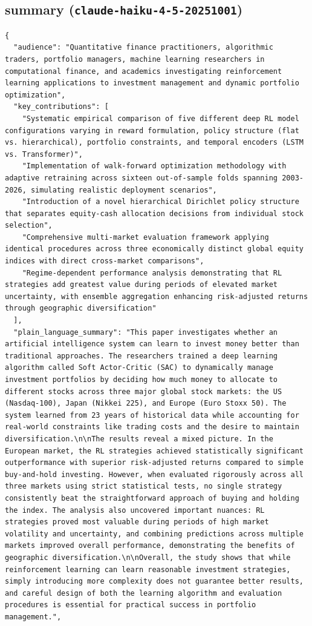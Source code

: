 \documentclass[11pt]{article}
\begin{document}
\subsection*{summary (\texttt{claude-haiku-4-5-20251001})}
\begin{verbatim}
{
  "audience": "Quantitative finance practitioners, algorithmic traders, portfolio managers, machine learning researchers in computational finance, and academics investigating reinforcement learning applications to investment management and dynamic portfolio optimization",
  "key_contributions": [
    "Systematic empirical comparison of five different deep RL model configurations varying in reward formulation, policy structure (flat vs. hierarchical), portfolio constraints, and temporal encoders (LSTM vs. Transformer)",
    "Implementation of walk-forward optimization methodology with adaptive retraining across sixteen out-of-sample folds spanning 2003-2026, simulating realistic deployment scenarios",
    "Introduction of a novel hierarchical Dirichlet policy structure that separates equity-cash allocation decisions from individual stock selection",
    "Comprehensive multi-market evaluation framework applying identical procedures across three economically distinct global equity indices with direct cross-market comparisons",
    "Regime-dependent performance analysis demonstrating that RL strategies add greatest value during periods of elevated market uncertainty, with ensemble aggregation enhancing risk-adjusted returns through geographic diversification"
  ],
  "plain_language_summary": "This paper investigates whether an artificial intelligence system can learn to invest money better than traditional approaches. The researchers trained a deep learning algorithm called Soft Actor-Critic (SAC) to dynamically manage investment portfolios by deciding how much money to allocate to different stocks across three major global stock markets: the US (Nasdaq-100), Japan (Nikkei 225), and Europe (Euro Stoxx 50). The system learned from 23 years of historical data while accounting for real-world constraints like trading costs and the desire to maintain diversification.\n\nThe results reveal a mixed picture. In the European market, the RL strategies achieved statistically significant outperformance with superior risk-adjusted returns compared to simple buy-and-hold investing. However, when evaluated rigorously across all three markets using strict statistical tests, no single strategy consistently beat the straightforward approach of buying and holding the index. The analysis also uncovered important nuances: RL strategies proved most valuable during periods of high market volatility and uncertainty, and combining predictions across multiple markets improved overall performance, demonstrating the benefits of geographic diversification.\n\nOverall, the study shows that while reinforcement learning can learn reasonable investment strategies, simply introducing more complexity does not guarantee better results, and careful design of both the learning algorithm and evaluation procedures is essential for practical success in portfolio management.",

\end{verbatim}
\end{document}
